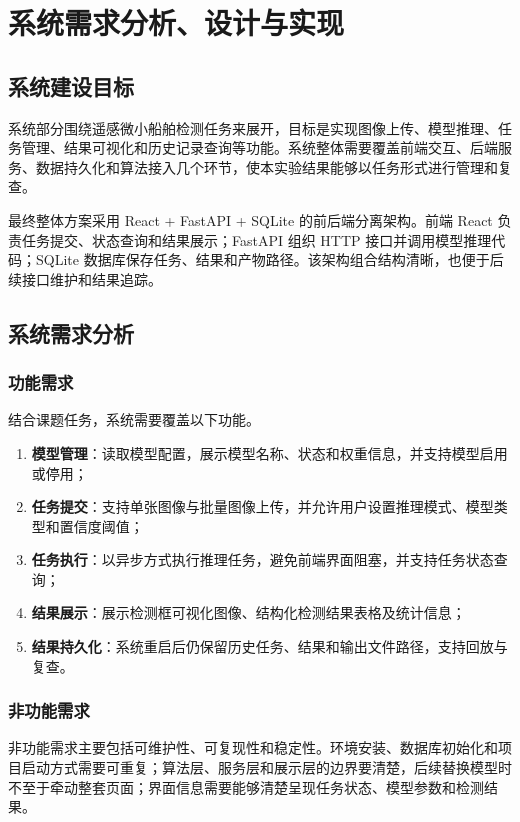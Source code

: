 \section{系统需求分析、设计与实现}\label{sec:system}

\subsection{系统建设目标}

系统部分围绕遥感微小船舶检测任务来展开，目标是实现图像上传、模型推理、任务管理、结果可视化和历史记录查询等功能。系统整体需要覆盖前端交互、后端服务、数据持久化和算法接入几个环节，使本实验结果能够以任务形式进行管理和复查。

最终整体方案采用 React + FastAPI + SQLite 的前后端分离架构。前端 React 负责任务提交、状态查询和结果展示；FastAPI 组织 HTTP 接口并调用模型推理代码；SQLite 数据库保存任务、结果和产物路径。该架构组合结构清晰，也便于后续接口维护和结果追踪。

\subsection{系统需求分析}

\subsubsection{功能需求}

结合课题任务，系统需要覆盖以下功能。

\begin{enumerate}
  \item \textbf{模型管理}：读取模型配置，展示模型名称、状态和权重信息，并支持模型启用或停用；
  \item \textbf{任务提交}：支持单张图像与批量图像上传，并允许用户设置推理模式、模型类型和置信度阈值；
  \item \textbf{任务执行}：以异步方式执行推理任务，避免前端界面阻塞，并支持任务状态查询；
  \item \textbf{结果展示}：展示检测框可视化图像、结构化检测结果表格及统计信息；
  \item \textbf{结果持久化}：系统重启后仍保留历史任务、结果和输出文件路径，支持回放与复查。
\end{enumerate}

\subsubsection{非功能需求}

非功能需求主要包括可维护性、可复现性和稳定性。环境安装、数据库初始化和项目启动方式需要可重复；算法层、服务层和展示层的边界要清楚，后续替换模型时不至于牵动整套页面；界面信息需要能够清楚呈现任务状态、模型参数和检测结果。


